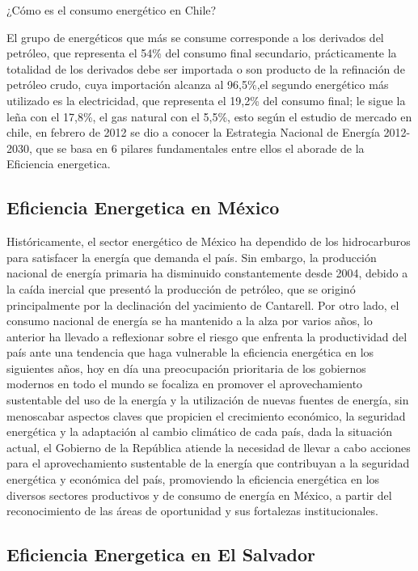 \documentclass[12pt,letterpaper]{report}
\begin{document}
¿Cómo es el consumo energético en Chile?

El grupo de energéticos que más se consume corresponde a los derivados del petróleo, que representa el 54\% del consumo final secundario, prácticamente la totalidad de los derivados debe ser importada o son producto de la refinación de petróleo crudo, cuya importación alcanza al 96,5\%,el segundo energético más utilizado es la electricidad, que representa el 19,2\% del consumo final; le sigue la leña con el 17,8\%, el gas natural con el 5,5\%, esto según el estudio de mercado en chile, en febrero de 2012 se dio a conocer la Estrategia Nacional de Energía 2012-2030, que se basa en 6 pilares fundamentales entre ellos el aborade de la Eficiencia energetica. 


 \subsection{Eficiencia Energetica en México}
 
 Históricamente, el sector energético de México ha dependido de los hidrocarburos para satisfacer la energía que demanda el país. Sin embargo, la producción nacional de energía primaria ha disminuido constantemente desde 2004, debido a la caída inercial que presentó la producción de petróleo, que se originó principalmente por la declinación del yacimiento de Cantarell. Por otro lado, el consumo nacional de energía se ha mantenido a la alza por varios años,
lo anterior ha llevado a reflexionar sobre el riesgo que enfrenta la productividad del país ante una tendencia que haga vulnerable la eficiencia energética en los siguientes años, hoy en día una preocupación prioritaria de los gobiernos modernos en todo el mundo se focaliza en promover el aprovechamiento sustentable del uso de la energía y la utilización de nuevas fuentes de energía, sin menoscabar aspectos claves que propicien el crecimiento económico, la seguridad energética y la adaptación al cambio climático de cada país, dada la situación actual, el Gobierno de la República atiende la necesidad de llevar a cabo acciones para el aprovechamiento sustentable de la energía que contribuyan a la seguridad energética y económica del país, promoviendo la eficiencia energética en los diversos sectores productivos y de consumo de energía en México, a partir del reconocimiento de las áreas de oportunidad y sus fortalezas institucionales\cite{Mexico}.

\subsection{Eficiencia Energetica en El Salvador}
\end{document}
